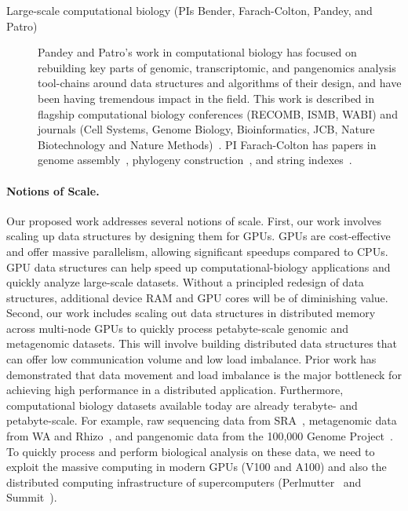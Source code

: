 \begin{description}
    \item[Large-scale computational biology (PIs Bender, Farach-Colton, Pandey, and Patro)] Pandey and Patro's work in computational biology has focused on rebuilding key parts of genomic, transcriptomic, and pangenomics analysis tool-chains around data structures and algorithms of their design, and have been having tremendous impact in the field. This work is described in flagship computational biology conferences (RECOMB, ISMB, WABI) and journals (Cell Systems, Genome Biology, Bioinformatics, JCB, Nature Biotechnology and Nature Methods)~\cite{PandeyAlBe18,PandeyBeJo17a,PandeyBeJo17b,AlmodaresiPFJP20,pandey2021variantstore,almodaresi2017rainbowfish,almodaresi2022incrementally,PatroSailfish:2014,Patro2017Salmon,Srivastava2019,he2022alevin,Almodaresi2018Pufferfish,Almodaresi2021}.  PI Farach-Colton has papers in genome assembly~\cite{Choi2003}, phylogeny construction~\cite{Farach97,Ambainis97,FarachKKM97,Farach1999, Cohen1997}, and string indexes~\cite{Farach97,Ambainis97}.

\end{description}


\paragraph{Notions of Scale.}
Our proposed work addresses several notions of scale.
First, our work involves scaling up data structures by designing them for GPUs. GPUs are cost-effective and offer massive parallelism, allowing significant speedups compared to CPUs. GPU data structures can help speed up computational-biology applications
and quickly analyze large-scale datasets. Without a principled redesign of data structures, additional device RAM and GPU cores will be of diminishing value.
Second, our work includes scaling out data structures in distributed memory across multi-node GPUs to quickly process petabyte-scale genomic and metagenomic datasets. This will involve building distributed data structures that can offer low communication volume and low load imbalance. Prior work has demonstrated that data movement and load imbalance is the major bottleneck for achieving high performance in a distributed application.
Furthermore, computational biology datasets available today are already terabyte- and petabyte-scale. For example, raw sequencing data from SRA~\cite{kodama2012sequence}, metagenomic data from WA and Rhizo~\cite{hofmeyr2020terabase}, and pangenomic data from the 100,000 Genome Project~\cite{1002021100}. 
To quickly process and perform biological analysis on these data, we need to exploit the massive computing in modern GPUs (V100 and A100) and also the distributed computing infrastructure of supercomputers (Perlmutter~\cite{perlmutter} and Summit~\cite{summit}).
